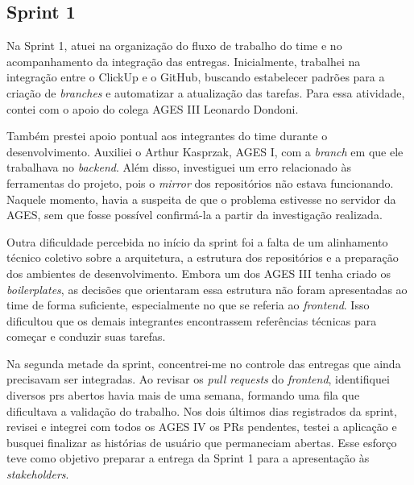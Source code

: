 \subsection{Sprint 1}

Na Sprint 1, atuei na organização do fluxo de trabalho do time e no
acompanhamento da integração das entregas. Inicialmente, trabalhei na integração
entre o ClickUp e o GitHub, buscando estabelecer padrões para a criação de
\textit{branches} e automatizar a atualização das tarefas. Para essa atividade,
contei com o apoio do colega AGES III Leonardo Dondoni.

Também prestei apoio pontual aos integrantes do time durante o desenvolvimento.
Auxiliei o Arthur Kasprzak, AGES I, com a \textit{branch} em que ele trabalhava no
\textit{backend}. Além disso, investiguei um erro relacionado às ferramentas do
projeto, pois o \textit{mirror} dos repositórios não estava funcionando. Naquele
momento, havia a suspeita de que o problema estivesse no servidor da AGES, sem que
fosse possível confirmá-la a partir da investigação realizada.

Outra dificuldade percebida no início da sprint foi a falta de um alinhamento
técnico coletivo sobre a arquitetura, a estrutura dos repositórios e a preparação
dos ambientes de desenvolvimento. Embora um dos AGES III tenha criado
os \textit{boilerplates}, as decisões que orientaram essa estrutura não foram
apresentadas ao time de forma suficiente, especialmente no que se referia ao
\textit{frontend}. Isso dificultou que os demais integrantes encontrassem
referências técnicas para começar e conduzir suas tarefas.

Na segunda metade da sprint, concentrei-me no controle das entregas que ainda
precisavam ser integradas. Ao revisar os \textit{pull requests} do
\textit{frontend}, identifiquei diversos \acp{pr} abertos havia mais de uma semana,
formando uma fila que dificultava a validação do trabalho. Nos dois últimos dias
registrados da sprint, revisei e integrei com todos os AGES IV os PRs pendentes, testei a aplicação e
busquei finalizar as histórias de usuário que permaneciam abertas. Esse esforço
teve como objetivo preparar a entrega da Sprint 1 para a apresentação às
\textit{stakeholders}.

\medskip

